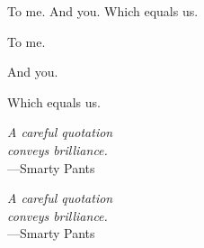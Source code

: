 %
\begin{frontmatter}

%
%
\makefrontmatter 

%
%   
%
%
%
%
\begin{dedication} 
 To me. And you. Which equals us.
\end{dedication}

\begin{mydedication} 
  \vspace{1in}
  \begin{flushleft}
    To me.
  \end{flushleft}
   
   \vspace{2in}
   \begin{center}
     And you.
   \end{center}

  \vspace{2in}
  \begin{flushright}
    Which equals us.
  \end{flushright}
\end{mydedication}



%
%

\begin{epigraph} 
  \emph{A careful quotation\\
  conveys brilliance.}\\
  ---Smarty Pants
\end{epigraph}

\begin{myepigraph}
   \vfil
   \begin{center}
     \emph{A careful quotation\\
     conveys brilliance.}\\
     ---Smarty Pants
   \end{center}
 \end{myepigraph}



\end{frontmatter}
